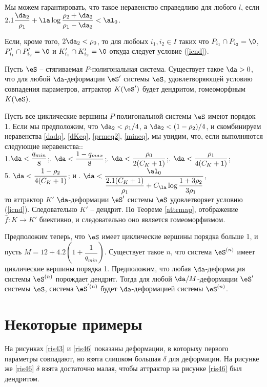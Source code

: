 Мы можем гарантировать, что такое неравенство справедливо для любого $l$, если 
$2.1\dfrac{\da_2}{\rho_1}+\la\log\dfrac{\rho_2+\da_2}{\rho_1-\da_2}<\al_0$.

Если, кроме того, $2\da_2<\rho_0$, то для любоых $i_1,i_2\in I$  таких что $P_{i_1}\cap P_{i_2}=\0$, $P'_{i_1}\cap P'_{i_2}=\0$  и $K'_{i_1}\cap K'_{i_2}=\0$ откуда следует условие (\ref{icnd}).
\vse
 
 
\begin{theorem}\label{mainthm}
Пусть $\eS$ -- стягиваемая $P$-полигональная система. Существует такое $\da>0$, что для любой $\da$-деформации $\eS'$ системы $\eS$, удовлетворяющей условию совпадения параметров, аттрактор $K(\eS')$ будет дендритом, гомеоморфным $K(\eS)$.
\end{theorem}

\dok  Пусть все циклические вершины $P$-полигональной системы $\eS$ имеют порядок 1. Если мы предположим, что $\da_2<\rho_1/4$, а $\da_2<(1-\rho_2)/4$, и скомбинируем неравенства \ref{dadq}, \ref{dKeq}, \ref{prmeq2}, \ref{mineq}, мы увидим, что, если выполняются следующие неравенства::\\
1.$\da<\dfrac{q_{min}}{8}$;. $\da<\dfrac{1-q_{max}}{8}$;. $\da<\dfrac{\rho_0}{2(C_K+1)}$;. $\da<\dfrac{\rho_1}{4(C_K+1)}$;\\
5. $\da<\dfrac{1-\rho_2}{4(C_K+1)}$; \qquad \qquad и . $\da<\dfrac{\al_0}{\dfrac{2.1(C_K+1)}{\rho_1}+C_\la\log\dfrac{1+3\rho_2}{3\rho_1}}$,\\ 
то аттрактор $K'$ $\da$-деформации $\eS'$ системы $\eS$ удовлетворяет условию (\ref{icnd}). Следовательно $K'$ -- дендрит. По Теореме \ref{attrmap}, отображение $\hat f:K\to K'$ биективно, и следовательно оно является гомеоморфизмом.
 
Предположим теперь, что $\eS$ имеет циклические вершины порядка больше 1, и пусть $M=12+4.2\left(1+\dfrac{1}{q_{min}}\right)$. Существует такое $n$, что система $\eS^{(n)}$ имеет циклические вершины порядка 1. Предположим, что любая $\da$-деформация системы $\eS^{(n)}$ порождает дендрит. Тогда для любой $\da/M$-деформации $\eS'$ системы $\eS$, система $\eS^{'(n)}$ будет $\da$-деформацией системы $\eS^{(n)}$.\vse


\newpage
\section{Некоторые примеры}


На рисунках \ref{ris43} и \ref{ris46} показаны деформации, в которыху первого параметры совпадают, но взята слишком большая $\delta$ для деформации. На рисунке же \ref{ris46}  $\delta$ взята достаточно малая, чтобы аттрактор на рисунке \ref{ris46} был дендритом.


